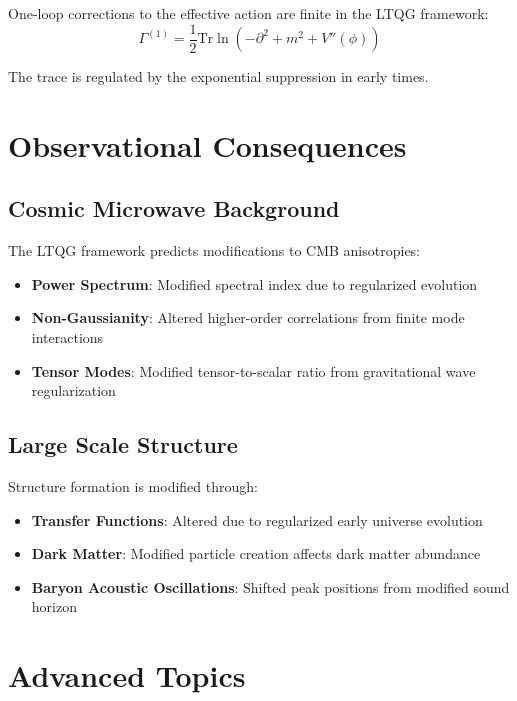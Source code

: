 \documentclass[11pt,a4paper]{article}
\begin{document}
One-loop corrections to the effective action are finite in the LTQG framework:
\begin{equation}
\Gamma^{(1)} = \frac{1}{2} \text{Tr} \ln\left(-\partial^2 + m^2 + V''(\phi)\right)
\end{equation}

The trace is regulated by the exponential suppression in early times.

\section{Observational Consequences}

\subsection{Cosmic Microwave Background}

The LTQG framework predicts modifications to CMB anisotropies:

\begin{itemize}
\item \textbf{Power Spectrum}: Modified spectral index due to regularized evolution
\item \textbf{Non-Gaussianity}: Altered higher-order correlations from finite mode interactions
\item \textbf{Tensor Modes}: Modified tensor-to-scalar ratio from gravitational wave regularization
\end{itemize}

\subsection{Large Scale Structure}

Structure formation is modified through:

\begin{itemize}
\item \textbf{Transfer Functions}: Altered due to regularized early universe evolution
\item \textbf{Dark Matter}: Modified particle creation affects dark matter abundance
\item \textbf{Baryon Acoustic Oscillations}: Shifted peak positions from modified sound horizon
\end{itemize}

\section{Advanced Topics}
\end{document}
